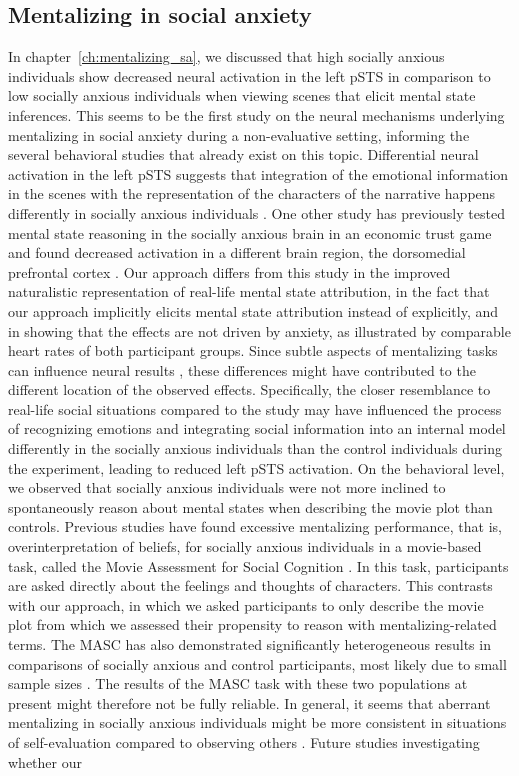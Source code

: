 \subsection{Mentalizing in social anxiety}
In chapter~\ref{ch:mentalizing_sa}, we discussed that high socially anxious individuals show decreased neural activation in the left pSTS in comparison to low socially anxious individuals when viewing scenes that elicit mental state inferences. This seems to be the first study on the neural mechanisms underlying mentalizing in social anxiety during a non-evaluative setting, informing the several behavioral studies that already exist on this topic. Differential neural activation in the left pSTS suggests that integration of the emotional information in the scenes with the representation of the characters of the narrative happens differently in socially anxious individuals \citep{patel2019,davey2016}. One other study has previously tested mental state reasoning in the socially anxious brain in an economic trust game and found decreased activation in a different brain region, the dorsomedial prefrontal cortex \citep[dmPFC; ][]{sripada2009}. Our approach differs from this study in the improved naturalistic representation of real-life mental state attribution, in the fact that our approach implicitly elicits mental state attribution instead of explicitly, and in showing that the effects are not driven by anxiety, as illustrated by comparable heart rates of both participant groups. Since subtle aspects of mentalizing tasks can influence neural results \citep{schurz2014}, these differences might have contributed to the different location of the observed effects. Specifically, the closer resemblance to real-life social situations compared to the \cite{sripada2009} study may have influenced the process of recognizing emotions and integrating social information into an internal model differently in the socially anxious individuals than the control individuals during the experiment, leading to reduced left pSTS activation. On the behavioral level, we observed that socially anxious individuals were not more inclined to spontaneously reason about mental states when describing the movie plot than controls. Previous studies have found excessive mentalizing performance, that is, overinterpretation of beliefs, for socially anxious individuals in a movie-based task, called the Movie Assessment for Social Cognition \citep[MASC; ][]{hezel2014,washburn2016,dziobek2006}. In this task, participants are asked directly about the feelings and thoughts of characters. This contrasts with our approach, in which we asked participants to only describe the movie plot from which we assessed their propensity to reason with mentalizing-related terms. The MASC has also demonstrated significantly heterogeneous results in comparisons of socially anxious and control participants, most likely due to small sample sizes \citep{baez2023}. The results of the MASC task with these two populations at present might therefore not be fully reliable. In general, it seems that aberrant mentalizing in socially anxious individuals might be more consistent in situations of self-evaluation compared to observing others \citep{ballespi2019}. Future studies investigating whether our 